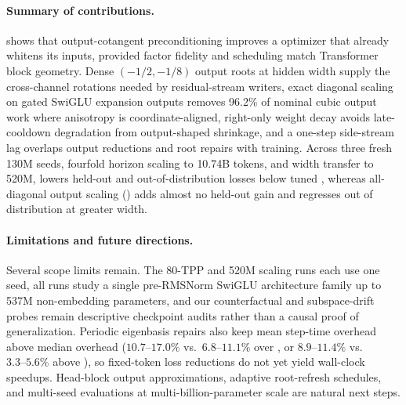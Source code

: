 \paragraph{Summary of contributions.}
 shows that output-cotangent preconditioning improves a  optimizer that already whitens its inputs, provided factor fidelity and scheduling match Transformer block geometry. Dense $(-1/2,-1/8)$ output roots at hidden width supply the cross-channel rotations needed by residual-stream writers, exact diagonal scaling on gated SwiGLU expansion outputs removes 96.2\% of nominal cubic output work where anisotropy is coordinate-aligned, right-only weight decay avoids late-cooldown degradation from output-shaped shrinkage, and a one-step side-stream lag overlaps output reductions and root repairs with training. Across three fresh 130M seeds, fourfold horizon scaling to 10.74B tokens, and width transfer to 520M,  lowers held-out and out-of-distribution losses below tuned , whereas all-diagonal output scaling () adds almost no held-out gain and regresses out of distribution at greater width.

\paragraph{Limitations and future directions.}
Several scope limits remain. The 80-TPP and 520M scaling runs each use one seed, all runs study a single pre-RMSNorm SwiGLU architecture family up to 537M non-embedding parameters, and our counterfactual and subspace-drift probes remain descriptive checkpoint audits rather than a causal proof of generalization. Periodic eigenbasis repairs also keep mean step-time overhead above median overhead ($10.7\text{--}17.0\%$ vs.\ $6.8\text{--}11.1\%$ over , or $8.9\text{--}11.4\%$ vs.\ $3.3\text{--}5.6\%$ above ), so fixed-token loss reductions do not yet yield wall-clock speedups. Head-block output approximations, adaptive root-refresh schedules, and multi-seed evaluations at multi-billion-parameter scale are natural next steps.
